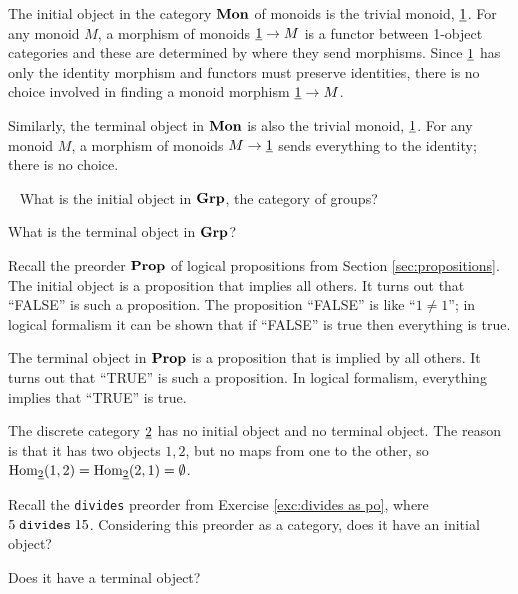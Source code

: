 \begin{example}\label{ex:initial monoid terminal monoid}

The initial object in the category ${\bf Mon}$ of monoids is the trivial monoid, $\underline{1}$. For any monoid $M$, a morphism of monoids $\underline{1}\rightarrow M$ is a functor between 1-object categories and these are determined by where they send morphisms. Since $\underline{1}$ has only the identity morphism and functors must preserve identities, there is no choice involved in finding a monoid morphism $\underline{1}\rightarrow M$.

Similarly, the terminal object in ${\bf Mon}$ is also the trivial monoid, $\underline{1}$. For any monoid $M$, a morphism of monoids $M\rightarrow\underline{1}$ sends everything to the identity; there is no choice.

\end{example}

\begin{exercise}~
\sexc What is the initial object in ${\bf Grp}$, the category of groups?
\item What is the terminal object in ${\bf Grp}$?
\endsexc
\end{exercise}
\begin{example}

Recall the preorder ${\bf Prop}$ of logical propositions from Section \ref{sec:propositions}. The initial object is a proposition that implies all others. It turns out that “FALSE” is such a proposition. The proposition “FALSE” is like “$1\neq1$”; in logical formalism it can be shown that if “FALSE” is true then everything is true.

The terminal object in ${\bf Prop}$ is a proposition that is implied by all others. It turns out that “TRUE” is such a proposition. In logical formalism, everything implies that “TRUE” is true.

\end{example}

\begin{example}

The discrete category $\underline{2}$ has no initial object and no terminal object. The reason is that it has two objects $1,2$, but no maps from one to the other, so $\textnormal{Hom}_{\underline{2}}(1,2)=\textnormal{Hom}_{\underline{2}}(2,1)=\emptyset$.

\end{example}

\begin{exercise}
Recall the {\tt divides} preorder from Exercise \ref{exc:divides as po}, where $5\;{\tt divides}\;15$.
\sexc Considering this preorder as a category, does it have an initial object?
\item Does it have a terminal object?
\endsexc
\end{exercise}

